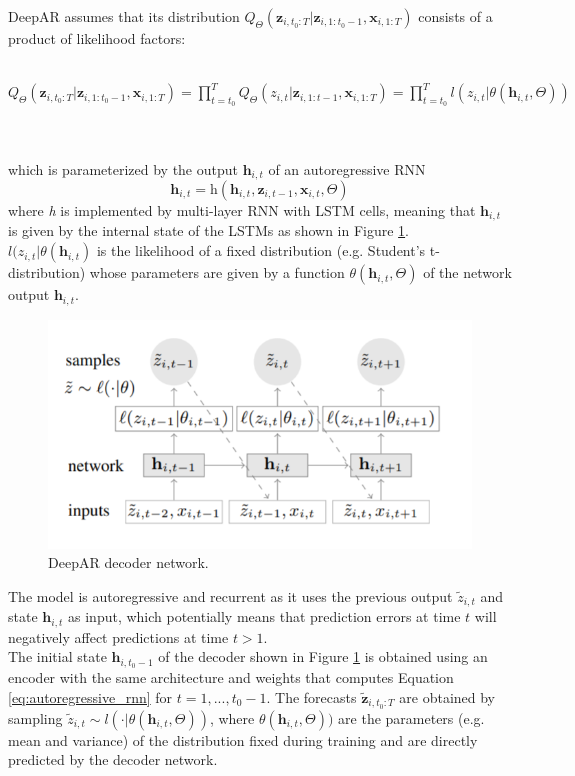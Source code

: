 \documentclass[a4paper, 12pt]{article} %
\begin{document}
	DeepAR assumes that its distribution $Q_{\Theta}(\pmb{z}_{i, t_0:T} | \pmb{z}_{i, 1:t_0-1}, \pmb{x}_{i, 1:T})$ consists of a product of likelihood factors:\\\\
	\centerline{
	$
	Q_{\Theta}(\pmb{z}_{i, t_0:T} | \pmb{z}_{i, 1:t_0-1}, \pmb{x}_{i, 1:T}) 
	= \prod_{t=t_0}^{T} Q_{\Theta}(z_{i, t} | \pmb{z}_{i, 1:t-1}, \pmb{x}_{i, 1:T})
	= \prod_{t=t_0}^{T} \textit{l}(z_{i,t} | \theta(\pmb{h}_{i,t}, \Theta))
	$
	}\\\\
	which is parameterized by the output $\pmb{h}_{i,t}$ of an autoregressive RNN
	\begin{equation} \label{eq:autoregressive_rnn}
		\pmb{h}_{i,t} = \textit{h}(\pmb{h}_{i,t}, \pmb{z}_{i, t-1}, \pmb{x}_{i, t}, \Theta )
	\end{equation}
	where \textit{h} is implemented by multi-layer RNN with LSTM cells, meaning that $\pmb{h}_{i,t}$ is given by the internal state of the LSTMs as shown in Figure \ref{fig:deepar}. \\
	$\textit{l}(z_{i,t} | \theta(\pmb{h}_{i,t})$ is the likelihood of a fixed distribution (e.g. Student's t-distribution) whose parameters are given by a function $\theta(\pmb{h}_{i,t}, \Theta)$ of the network output $\pmb{h}_{i,t}$.
	\begin{figure}
		\includegraphics[width=\linewidth]{img/deepar.png}
		\caption{DeepAR decoder network.}
		\label{fig:deepar}
	\end{figure}
	The model is autoregressive and recurrent as it uses the previous output $\tilde{z}_{i,t}$ and state $\pmb{h}_{i,t}$ as input, which potentially means that prediction errors at time $t$ will negatively affect predictions at time $t>1$. \\
	The initial state $\pmb{h}_{i,t_0-1}$ of the decoder shown in Figure \ref{fig:deepar} is obtained using an encoder with the same architecture and weights that computes Equation \ref{eq:autoregressive_rnn} for $t = 1, ..., t_0-1$. The forecasts $\tilde{\pmb{z}}_{i, t_0:T}$ are obtained by sampling $\tilde{z}_{i,t} \sim l(\cdot | \theta(\pmb{h}_{i,t}, \Theta))$, where $\theta(\pmb{h}_{i,t}, \Theta))$ are the parameters (e.g. mean and variance) of the distribution fixed during training and are directly predicted by the decoder network.
	
\end{document}
